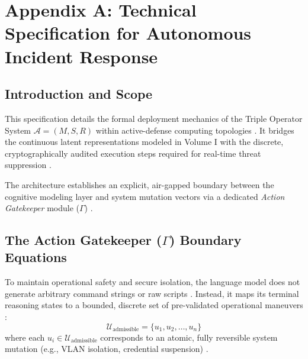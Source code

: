 
\chapter{\texorpdfstring{Appendix A: Technical Specification for Autonomous Incident Response}{Appendix A: Autonomous Incident Response Spec}}
\label{ch:appendix_manifesto}

\section{Introduction and Scope}
This specification details the formal deployment mechanics of the Triple Operator System $\mathcal{A} = (M, S, R)$ within active-defense computing topologies \cite{Realignment:TripleOperators,Bahdanau2016,DLI:MemoryIntegration}. It bridges the continuous latent representations modeled in Volume I with the discrete, cryptographically audited execution steps required for real-time threat suppression \cite{Realignment:TripleOperators}. 

The architecture establishes an explicit, air-gapped boundary between the cognitive modeling layer and system mutation vectors via a dedicated \textit{Action Gatekeeper} module ($\Gamma$) \cite{Manifesto:IncidentResponse,Realignment:TripleOperators}.

\section{\texorpdfstring{The Action Gatekeeper ($\Gamma$) Boundary Equations}{The Action Gatekeeper Boundary Equations}}
To maintain operational safety and secure isolation, the language model does not generate arbitrary command strings or raw scripts \cite{Manifesto:IncidentResponse}. Instead, it maps its terminal reasoning states to a bounded, discrete set of pre-validated operational maneuvers \cite{Manifesto:IncidentResponse}:
\begin{equation}
    \mathcal{U}_{\text{admissible}} = \{u_1, u_2, \dots, u_n\}
\end{equation}
where each $u_i \in \mathcal{U}_{\text{admissible}}$ corresponds to an atomic, fully reversible system mutation (e.g., VLAN isolation, credential suspension) \cite{Manifesto:IncidentResponse}.

